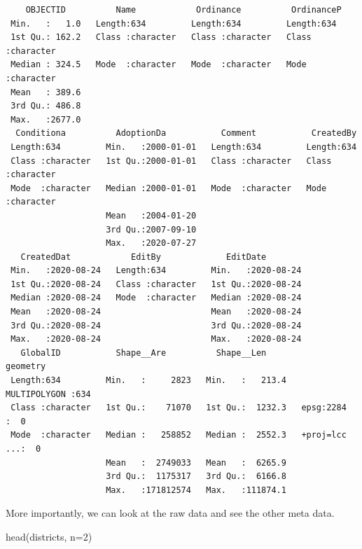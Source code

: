 \documentclass[
  letterpaper,
]{book}
\newenvironment{Shaded}{\begin{snugshade}}{\end{snugshade}}
\newcommand{\AttributeTok}[1]{\textcolor[rgb]{0.40,0.45,0.13}{#1}}
\newcommand{\DecValTok}[1]{\textcolor[rgb]{0.68,0.00,0.00}{#1}}
\newcommand{\FunctionTok}[1]{\textcolor[rgb]{0.28,0.35,0.67}{#1}}
\newcommand{\NormalTok}[1]{\textcolor[rgb]{0.00,0.23,0.31}{#1}}
\begin{document}
\begin{verbatim}
    OBJECTID          Name            Ordinance          OrdinanceP       
 Min.   :   1.0   Length:634         Length:634         Length:634        
 1st Qu.: 162.2   Class :character   Class :character   Class :character  
 Median : 324.5   Mode  :character   Mode  :character   Mode  :character  
 Mean   : 389.6                                                           
 3rd Qu.: 486.8                                                           
 Max.   :2677.0                                                           
  Conditiona          AdoptionDa           Comment           CreatedBy        
 Length:634         Min.   :2000-01-01   Length:634         Length:634        
 Class :character   1st Qu.:2000-01-01   Class :character   Class :character  
 Mode  :character   Median :2000-01-01   Mode  :character   Mode  :character  
                    Mean   :2004-01-20                                        
                    3rd Qu.:2007-09-10                                        
                    Max.   :2020-07-27                                        
   CreatedDat            EditBy             EditDate         
 Min.   :2020-08-24   Length:634         Min.   :2020-08-24  
 1st Qu.:2020-08-24   Class :character   1st Qu.:2020-08-24  
 Median :2020-08-24   Mode  :character   Median :2020-08-24  
 Mean   :2020-08-24                      Mean   :2020-08-24  
 3rd Qu.:2020-08-24                      3rd Qu.:2020-08-24  
 Max.   :2020-08-24                      Max.   :2020-08-24  
   GlobalID           Shape__Are          Shape__Len                geometry  
 Length:634         Min.   :     2823   Min.   :   213.4   MULTIPOLYGON :634  
 Class :character   1st Qu.:    71070   1st Qu.:  1232.3   epsg:2284    :  0  
 Mode  :character   Median :   258852   Median :  2552.3   +proj=lcc ...:  0  
                    Mean   :  2749033   Mean   :  6265.9                      
                    3rd Qu.:  1175317   3rd Qu.:  6166.8                      
                    Max.   :171812574   Max.   :111874.1                      
\end{verbatim}

More importantly, we can look at the raw data and see the other meta
data.

\begin{Shaded}
\begin{Highlighting}[]
\FunctionTok{head}\NormalTok{(districts, }\AttributeTok{n=}\DecValTok{2}\NormalTok{)}
\end{Highlighting}
\end{Shaded}
\end{document}
